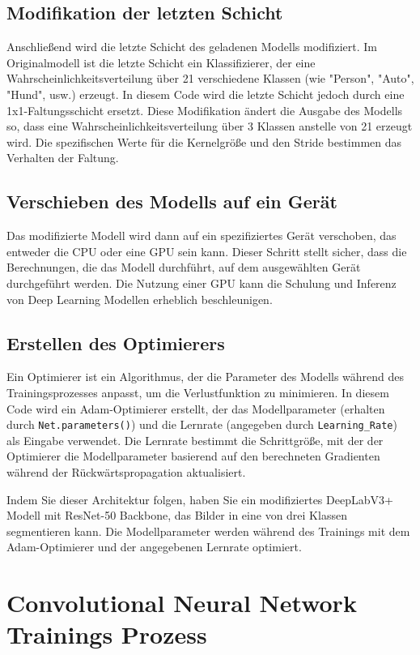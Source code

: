 \section{Modifikation der letzten Schicht}
    Anschließend wird die letzte Schicht des geladenen Modells modifiziert. Im Originalmodell ist die letzte Schicht ein Klassifizierer, der eine Wahrscheinlichkeitsverteilung über 21 verschiedene Klassen (wie "Person", "Auto", "Hund", usw.) erzeugt. In diesem Code wird die letzte Schicht jedoch durch eine 1x1-Faltungsschicht ersetzt. Diese Modifikation ändert die Ausgabe des Modells so, dass eine Wahrscheinlichkeitsverteilung über 3 Klassen anstelle von 21 erzeugt wird. Die spezifischen Werte für die Kernelgröße und den Stride bestimmen das Verhalten der Faltung.

\section{Verschieben des Modells auf ein Gerät}
    Das modifizierte Modell wird dann auf ein spezifiziertes Gerät verschoben, das entweder die CPU oder eine GPU sein kann. Dieser Schritt stellt sicher, dass die Berechnungen, die das Modell durchführt, auf dem ausgewählten Gerät durchgeführt werden. Die Nutzung einer GPU kann die Schulung und Inferenz von Deep Learning Modellen erheblich beschleunigen.

\section{Erstellen des Optimierers}
    Ein Optimierer ist ein Algorithmus, der die Parameter des Modells während des Trainingsprozesses anpasst, um die Verlustfunktion zu minimieren. In diesem Code wird ein Adam-Optimierer erstellt, der das Modellparameter (erhalten durch \texttt{Net.parameters()}) und die Lernrate (angegeben durch \texttt{Learning\_Rate}) als Eingabe verwendet. Die Lernrate bestimmt die Schrittgröße, mit der der Optimierer die Modellparameter basierend auf den berechneten Gradienten während der Rückwärtspropagation aktualisiert.
    
    Indem Sie dieser Architektur folgen, haben Sie ein modifiziertes DeepLabV3+ Modell mit ResNet-50 Backbone, das Bilder in eine von drei Klassen segmentieren kann. Die Modellparameter werden während des Trainings mit dem Adam-Optimierer und der angegebenen Lernrate optimiert.



\chapter{Convolutional Neural Network Trainings Prozess}

